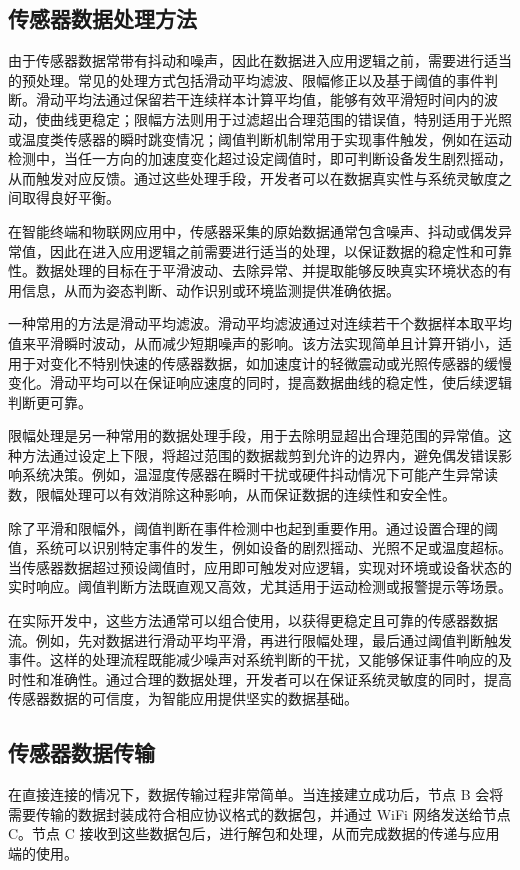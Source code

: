 \subsection{传感器数据处理方法}
由于传感器数据常带有抖动和噪声，因此在数据进入应用逻辑之前，需要进行适当的预处理。常见的处理方式包括滑动平均滤波、限幅修正以及基于阈值的事件判断。滑动平均法通过保留若干连续样本计算平均值，能够有效平滑短时间内的波动，使曲线更稳定；限幅方法则用于过滤超出合理范围的错误值，特别适用于光照或温度类传感器的瞬时跳变情况；阈值判断机制常用于实现事件触发，例如在运动检测中，当任一方向的加速度变化超过设定阈值时，即可判断设备发生剧烈摇动，从而触发对应反馈。通过这些处理手段，开发者可以在数据真实性与系统灵敏度之间取得良好平衡。

在智能终端和物联网应用中，传感器采集的原始数据通常包含噪声、抖动或偶发异常值，因此在进入应用逻辑之前需要进行适当的处理，以保证数据的稳定性和可靠性。数据处理的目标在于平滑波动、去除异常、并提取能够反映真实环境状态的有用信息，从而为姿态判断、动作识别或环境监测提供准确依据。

一种常用的方法是滑动平均滤波。滑动平均滤波通过对连续若干个数据样本取平均值来平滑瞬时波动，从而减少短期噪声的影响。该方法实现简单且计算开销小，适用于对变化不特别快速的传感器数据，如加速度计的轻微震动或光照传感器的缓慢变化。滑动平均可以在保证响应速度的同时，提高数据曲线的稳定性，使后续逻辑判断更可靠。

限幅处理是另一种常用的数据处理手段，用于去除明显超出合理范围的异常值。这种方法通过设定上下限，将超过范围的数据裁剪到允许的边界内，避免偶发错误影响系统决策。例如，温湿度传感器在瞬时干扰或硬件抖动情况下可能产生异常读数，限幅处理可以有效消除这种影响，从而保证数据的连续性和安全性。

除了平滑和限幅外，阈值判断在事件检测中也起到重要作用。通过设置合理的阈值，系统可以识别特定事件的发生，例如设备的剧烈摇动、光照不足或温度超标。当传感器数据超过预设阈值时，应用即可触发对应逻辑，实现对环境或设备状态的实时响应。阈值判断方法既直观又高效，尤其适用于运动检测或报警提示等场景。

在实际开发中，这些方法通常可以组合使用，以获得更稳定且可靠的传感器数据流。例如，先对数据进行滑动平均平滑，再进行限幅处理，最后通过阈值判断触发事件。这样的处理流程既能减少噪声对系统判断的干扰，又能够保证事件响应的及时性和准确性。通过合理的数据处理，开发者可以在保证系统灵敏度的同时，提高传感器数据的可信度，为智能应用提供坚实的数据基础。
\subsection{传感器数据传输}
在直接连接的情况下，数据传输过程非常简单。当连接建立成功后，节点 B 会将需要传输的数据封装成符合相应协议格式的数据包，并通过 WiFi 网络发送给节点 C。节点 C 接收到这些数据包后，进行解包和处理，从而完成数据的传递与应用端的使用。

